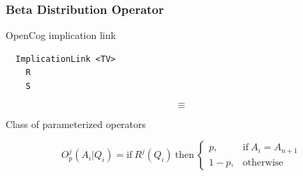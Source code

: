 \documentclass{beamer}
\begin{document}
\begin{frame}
\begin{columns}
\end{columns}





\end{frame}

\begin{frame}[fragile]
  \frametitle{Beta Distribution Operator}

OpenCog implication link
{\small
\begin{verbatim}
  ImplicationLink <TV>
    R
    S
\end{verbatim}
}

$$
\equiv
$$

Class of parameterized operators

  $$
  O^j_p(A_i|Q_i) = \text{if}\ R^j(Q_i)\ \text{then}\
  \begin{cases}
    p, & \text{if}\ A_i = A_{n+1}\\
    1-p, & \text{otherwise}
  \end{cases}
  $$
\end{frame}
\end{document}
